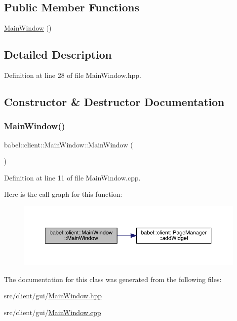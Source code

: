 \subsection*{Public Member Functions}
\begin{DoxyCompactItemize}
\item 
\mbox{\hyperlink{classbabel_1_1client_1_1_main_window_a862e6cf68f9ea92dee3f55eb67b41b76}{Main\+Window}} ()
\end{DoxyCompactItemize}


\subsection{Detailed Description}


Definition at line 28 of file Main\+Window.\+hpp.



\subsection{Constructor \& Destructor Documentation}
\mbox{\label{classbabel_1_1client_1_1_main_window_a862e6cf68f9ea92dee3f55eb67b41b76}} 
\subsubsection{\texorpdfstring{Main\+Window()}{MainWindow()}}
{\footnotesize\ttfamily babel\+::client\+::\+Main\+Window\+::\+Main\+Window (\begin{DoxyParamCaption}{ }\end{DoxyParamCaption})}



Definition at line 11 of file Main\+Window.\+cpp.

Here is the call graph for this function\+:\nopagebreak
\begin{figure}[H]
\begin{center}
\leavevmode
\includegraphics[width=350pt]{classbabel_1_1client_1_1_main_window_a862e6cf68f9ea92dee3f55eb67b41b76_cgraph}
\end{center}
\end{figure}


The documentation for this class was generated from the following files\+:\begin{DoxyCompactItemize}
\item 
src/client/gui/\mbox{\hyperlink{_main_window_8hpp}{Main\+Window.\+hpp}}\item 
src/client/gui/\mbox{\hyperlink{_main_window_8cpp}{Main\+Window.\+cpp}}\end{DoxyCompactItemize}
